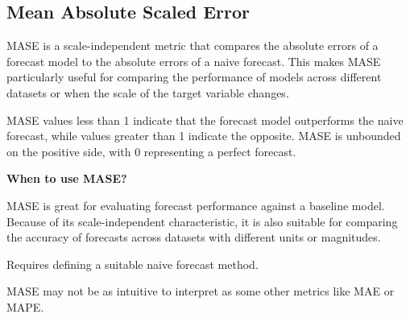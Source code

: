 \subsection{Mean Absolute Scaled Error}

MASE is a scale-independent metric that compares the absolute errors of a forecast model to the absolute errors of a naive forecast.
This makes MASE particularly useful for comparing the performance of models across different datasets or when the scale of the target variable changes.
\vspace{-1em}
\begin{center}
\end{center}
\vspace{-1em}
MASE values less than 1 indicate that the forecast model outperforms the naive forecast, while values greater than 1 indicate the opposite.
MASE is unbounded on the positive side, with 0 representing a perfect forecast.

\textbf{When to use MASE?}

MASE is great for evaluating forecast performance against a baseline model. Because of its scale-independent characteristic, it is also suitable for comparing the accuracy
of forecasts across datasets with different units or magnitudes.

{
    \item Requires defining a suitable naive forecast method.    
    \item MASE may not be as intuitive to interpret as some other metrics like MAE or MAPE.
}

